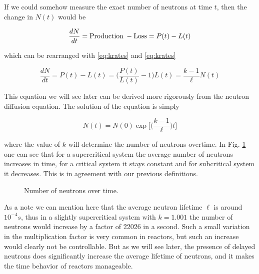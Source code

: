 If we could somehow measure the exact number of neutrons at time $t$, then the change in $N(t)$ would be

$$\frac{dN}{dt}={\rm Production \: - Loss}=P(t)-L(t)$$

which can be rearranged with \eqref{eq:krates} and \eqref{eq:krates}

\begin{equation}
\frac{dN}{dt}=P(t)-L(t)=\Big(\frac{P(t)}{L(t)}-1 \Big)L(t)=\frac{k-1}{\ell} N(t)
\end{equation}

\noindent This equation we will see later can be derived more rigorously from the neutron diffusion equation. The solution of the equation is simply

\begin{equation}
N(t)=N(0)\exp\Bigg[\Bigg(\frac{k-1}{\ell}\Bigg)t\Bigg]
\end{equation}

\noindent where the value of $k$ will determine the number of neutrons overtime. In Fig. \ref{fig:basickinetics} one can see that for a supercritical system the average number of neutrons increases in time, for a critical system it stays constant and for subcritical system it decreases. This is in agreement with our previous definitions.

\begin{figure}[ht!]
\protect {}\protect
\caption{\label{fig:basickinetics} \footnotesize{Number of neutrons over time.}}
\end{figure}

As a note we can mention here that the average neutron lifetime $\ell$ is around $10^{-4}s$, thus in a slightly supercritical system with $k=1.001$ the number of neutrons would increase by a factor of 22026 in a second. Such a small variation in the multiplication factor is very common in reactors, but such an increase would clearly not be controllable. But as we will see later, the presence of delayed neutrons does significantly increase the average lifetime of neutrons, and it makes the time behavior of reactors manageable.

